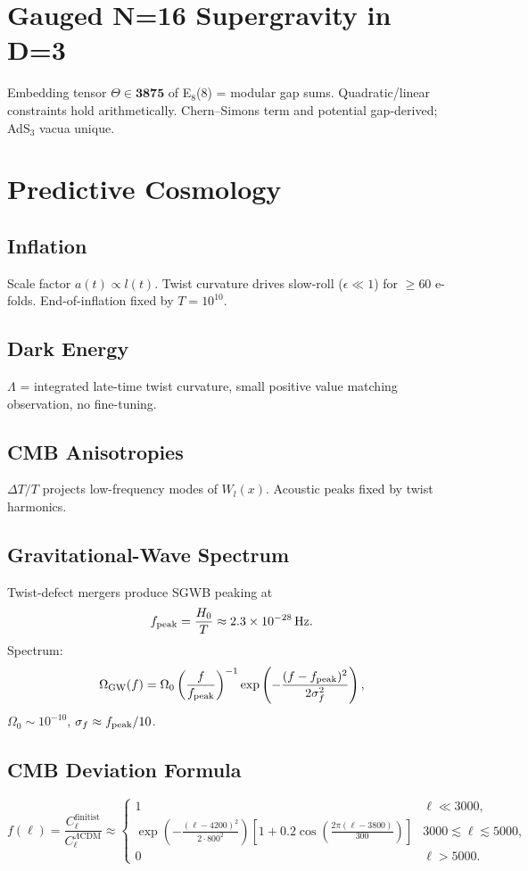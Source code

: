 \documentclass[11pt]{article}
\begin{document}
\section{Gauged N=16 Supergravity in D=3}
Embedding tensor $\Theta \in \mathbf{3875}$ of E$_8$(8) = modular gap sums. Quadratic/linear constraints hold arithmetically. Chern–Simons term and potential gap-derived; AdS$_3$ vacua unique.

\section{Predictive Cosmology}

\subsection{Inflation}
Scale factor $a(t) \propto l(t)$. Twist curvature drives slow-roll ($\epsilon \ll 1$) for $\ge 60$ e-folds. End-of-inflation fixed by $T=10^{10}$.

\subsection{Dark Energy}
$\Lambda$ = integrated late-time twist curvature, small positive value matching observation, no fine-tuning.

\subsection{CMB Anisotropies}
$\Delta T/T$ projects low-frequency modes of $W_l(x)$. Acoustic peaks fixed by twist harmonics.

\subsection{Gravitational-Wave Spectrum}
Twist-defect mergers produce SGWB peaking at
\[
f_{\rm peak} = \frac{H_0}{T} \approx 2.3 \times 10^{-28} \, \text{Hz}.
\]
Spectrum:
\[
\Omega_{\rm GW}(f) = \Omega_0 \left( \frac{f}{f_{\rm peak}} \right)^{-1} \exp\left( -\frac{(f - f_{\rm peak})^2}{2\sigma_f^2} \right),
\]
$\Omega_0 \sim 10^{-10}$, $\sigma_f \approx f_{\rm peak}/10$.

\subsection{CMB Deviation Formula}
\[
f(\ell) = \frac{C_\ell^{\text{finitist}}}{C_\ell^{\Lambda\text{CDM}}} \approx
\begin{cases}
1 & \ell \ll 3000, \\
\exp\left( -\frac{(\ell - 4200)^2}{2 \cdot 800^2} \right) \left[ 1 + 0.2 \cos\left( \frac{2\pi (\ell - 3800)}{300} \right) \right] & 3000 \lesssim \ell \lesssim 5000, \\
0 & \ell > 5000.
\end{cases}
\]
\end{document}
